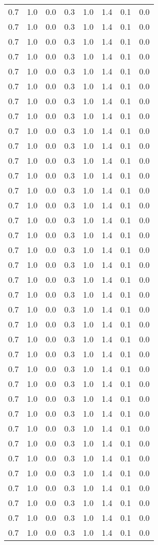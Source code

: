 \begin{tabular}{L{1in}|L{1in}|L{1in}|L{1in}|L{1in}|L{1in}|L{1in}|L{1in}}
0.7&1.0&0.0&0.3&1.0&1.4&0.1&0.0\\
0.7&1.0&0.0&0.3&1.0&1.4&0.1&0.0\\
0.7&1.0&0.0&0.3&1.0&1.4&0.1&0.0\\
0.7&1.0&0.0&0.3&1.0&1.4&0.1&0.0\\
0.7&1.0&0.0&0.3&1.0&1.4&0.1&0.0\\
0.7&1.0&0.0&0.3&1.0&1.4&0.1&0.0\\
0.7&1.0&0.0&0.3&1.0&1.4&0.1&0.0\\
0.7&1.0&0.0&0.3&1.0&1.4&0.1&0.0\\
0.7&1.0&0.0&0.3&1.0&1.4&0.1&0.0\\
0.7&1.0&0.0&0.3&1.0&1.4&0.1&0.0\\
0.7&1.0&0.0&0.3&1.0&1.4&0.1&0.0\\
0.7&1.0&0.0&0.3&1.0&1.4&0.1&0.0\\
0.7&1.0&0.0&0.3&1.0&1.4&0.1&0.0\\
0.7&1.0&0.0&0.3&1.0&1.4&0.1&0.0\\
0.7&1.0&0.0&0.3&1.0&1.4&0.1&0.0\\
0.7&1.0&0.0&0.3&1.0&1.4&0.1&0.0\\
0.7&1.0&0.0&0.3&1.0&1.4&0.1&0.0\\
0.7&1.0&0.0&0.3&1.0&1.4&0.1&0.0\\
0.7&1.0&0.0&0.3&1.0&1.4&0.1&0.0\\
0.7&1.0&0.0&0.3&1.0&1.4&0.1&0.0\\
0.7&1.0&0.0&0.3&1.0&1.4&0.1&0.0\\
0.7&1.0&0.0&0.3&1.0&1.4&0.1&0.0\\
0.7&1.0&0.0&0.3&1.0&1.4&0.1&0.0\\
0.7&1.0&0.0&0.3&1.0&1.4&0.1&0.0\\
0.7&1.0&0.0&0.3&1.0&1.4&0.1&0.0\\
0.7&1.0&0.0&0.3&1.0&1.4&0.1&0.0\\
0.7&1.0&0.0&0.3&1.0&1.4&0.1&0.0\\
0.7&1.0&0.0&0.3&1.0&1.4&0.1&0.0\\
0.7&1.0&0.0&0.3&1.0&1.4&0.1&0.0\\
0.7&1.0&0.0&0.3&1.0&1.4&0.1&0.0\\
0.7&1.0&0.0&0.3&1.0&1.4&0.1&0.0\\
0.7&1.0&0.0&0.3&1.0&1.4&0.1&0.0\\
0.7&1.0&0.0&0.3&1.0&1.4&0.1&0.0\\
0.7&1.0&0.0&0.3&1.0&1.4&0.1&0.0\\
0.7&1.0&0.0&0.3&1.0&1.4&0.1&0.0\\
0.7&1.0&0.0&0.3&1.0&1.4&0.1&0.0\\

\end{tabular}
